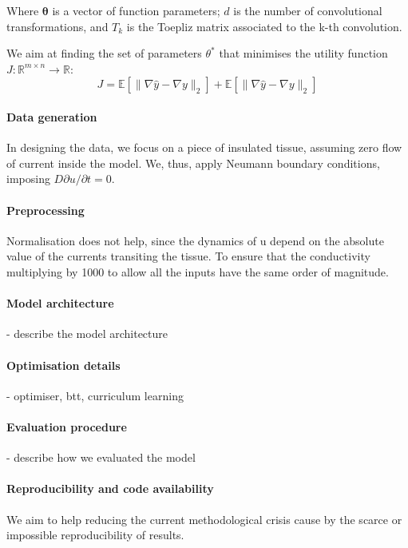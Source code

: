 \documentclass{article}
\begin{document}
            Where $\mathbf{\theta}$ is a vector of function parameters; $d$ is the number of convolutional transformations, and $T_k$ is the Toepliz matrix associated to the k-th convolution.
            
            We aim at finding the set of parameters $\theta^*$ that minimises the utility function $J: \mathbb{R}^{m \times n} \rightarrow \mathbb{R}$:
            \begin{equation}
                J = \mathbb{E}[\lVert \nabla \hat{y} - \nabla y \lVert_2] + \mathbb{E}[\lVert \nabla \hat{y} - \nabla y \lVert_2]
            \end{equation}
        
        
        \paragraph{Data generation}
            In designing the data, we focus on a piece of insulated tissue, assuming zero flow of current inside the model. We, thus, apply Neumann boundary conditions, imposing $D \partial u/ \partial t = 0$.
        
        \paragraph{Preprocessing}
        Normalisation does not help, since the dynamics of u depend on the absolute value of the currents transiting the tissue. To ensure that the conductivity multiplying by 1000 to allow all the inputs have the same order of magnitude. 
        \paragraph{Model architecture}
        - describe the model architecture
        
        \paragraph{Optimisation details}
        - optimiser, btt, curriculum learning
        
        \paragraph{Evaluation procedure}
        - describe how we evaluated the model
        
        \paragraph{Reproducibility and code availability}
        We aim to help reducing the current methodological crisis cause by the scarce or impossible reproducibility of results. 
        
\end{document}
